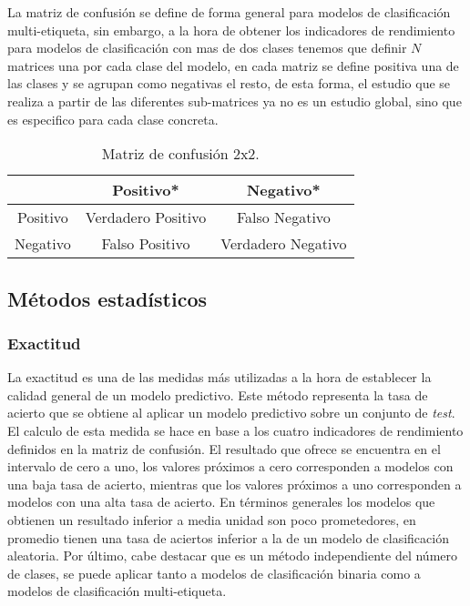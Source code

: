 \pagebreak

La matriz de confusión se define de forma general para modelos de clasificación multi-etiqueta, sin embargo, a la hora de obtener los indicadores de rendimiento para modelos de clasificación con mas de dos clases tenemos que definir $N$ matrices una por cada clase del modelo, en cada matriz se define positiva una de las clases y se agrupan como negativas el resto, de esta forma, el estudio que se realiza a partir de las diferentes sub-matrices ya no es un estudio global, sino que es especifico para cada clase concreta.

\begin{table}[ht]
    \centering
    \begin{tabular}[t]{ccc}
                 & Positivo*          & Negativo*          \\\hline
        Positivo & Verdadero Positivo & Falso Negativo     \\\hline
        Negativo & Falso Positivo     & Verdadero Negativo \\\hline
    \end{tabular}

    \caption{Matriz de confusión 2x2.}
    \label{tab:1}
\end{table}


\subsection{Métodos estadísticos}


\subsubsection{Exactitud}

La exactitud es una de las medidas más utilizadas a la hora de establecer la calidad general de un modelo predictivo. Este método representa la tasa de acierto que se obtiene al aplicar un modelo predictivo sobre un conjunto de \textit{test}. El calculo de esta medida se hace en base a los cuatro indicadores de rendimiento definidos en la matriz de confusión. El resultado que ofrece se encuentra en el intervalo de cero a uno, los valores próximos a cero corresponden a modelos con una baja tasa de acierto, mientras que los valores próximos a uno corresponden a modelos con una alta tasa de acierto. En términos generales los modelos que obtienen un resultado inferior a media unidad son poco prometedores, en promedio tienen una tasa de aciertos inferior a la de un modelo de clasificación aleatoria. Por último, cabe destacar que es un método independiente del número de clases, se puede aplicar tanto a modelos de clasificación binaria como a modelos de clasificación multi-etiqueta.

